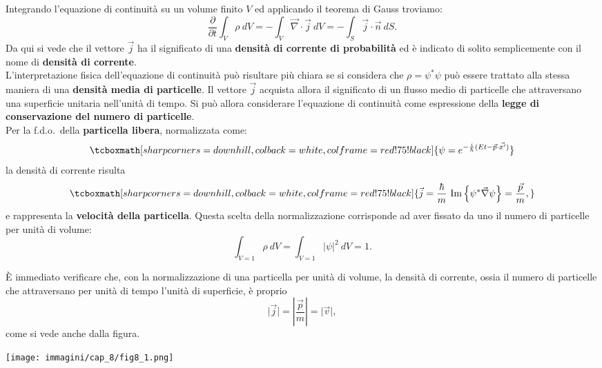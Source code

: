 Integrando l'equazione di continuità su un volume finito $V$ ed applicando il teorema di Gauss troviamo:
\begin{equation}
\frac{\partial }{\partial t} \int _V \rho\ dV = - \int _V \vec{\nabla}\cdot\vec{j}\ dV = -\int _S \vec{j}\cdot\vec{n}\ dS.
\end{equation}
Da qui si vede che il vettore $\vec{j}$ ha il significato di una \textbf{densità di corrente di probabilità} ed è indicato di solito semplicemente con il nome di \textbf{densità di corrente}.\\

L'interpretazione fisica dell'equazione di continuità può risultare più chiara se si considera che $\rho= \psi^* \psi$ può essere trattato alla stessa maniera di una \textbf{densità media di particelle}. Il vettore $\vec{j}$ acquista allora il significato di un flusso medio di particelle che attraversano una superficie unitaria nell'unità di tempo. Si può allora considerare l'equazione di continuità come espressione della \textbf{legge di conservazione del numero di particelle}.\\

Per la f.d.o.~della \textbf{particella libera}, normalizzata come:
	\begin{equation}
		\tcboxmath[sharp corners=downhill, colback=white, colframe=red!75!black]{
			\psi  =  e^{-\frac{i}{\hbar} (Et - \vec{p}\cdot \vec{x'})}
			}
	\end{equation}
la densità di corrente risulta
	\begin{equation}
		\tcboxmath[sharp corners=downhill, colback=white, colframe=red!75!black]{
			\vec{j}= \frac{\hbar}{m}\ \textrm{Im}\left\{\psi ^* \vec{\nabla}\psi \right\}= \frac{\vec{p}}{m},
			}
	\end{equation}
e rappresenta la \textbf{velocità della particella}. Questa scelta della normalizzazione corrisponde ad aver fissato da uno il numero di particelle per unità di volume:
	\begin{equation}
		\int _{V=1} \rho \ dV = \int _{V=1} \vert \psi \vert ^2 \ dV=1.
	\end{equation}
\begin{center}
\begin{tcolorbox}[toprule=3mm, width=.9\textwidth, colback=white]
È immediato verificare che, con la normalizzazione di una particella per unità di volume, la densità di corrente, ossia il numero di particelle che attraversano per unità di tempo l'unità di superficie, è proprio
\begin{equation}
\vert \vec{j} \vert= \left\vert \frac{\vec{p}}{m} \right\vert =\vert \vec{v} \vert ,
\end{equation}
come si vede anche dalla figura.
\begin{center}
\texttt{[image: immagini/cap\_8/fig8\_1.png]}
\end{center}
\end{tcolorbox}
\end{center}

